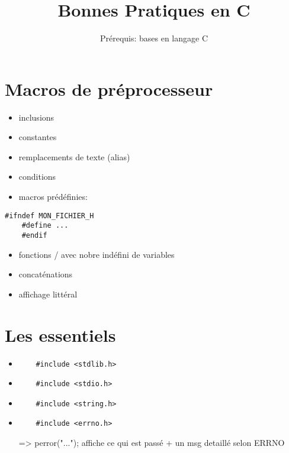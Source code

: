 \documentclass{article}
\title{Bonnes Pratiques en C}
\author{Prérequis: bases en langage C}
\date{}
\begin{document}
\maketitle
\section*{Macros de préprocesseur}
\begin{itemize}
\item inclusions
\item constantes
\item remplacements de texte (alias)
\item conditions
\item macros prédéfinies:
\end{itemize}

    \begin{lstlisting}[xleftmargin=\parindent]
    #ifndef MON_FICHIER_H
    #define ...
    #endif
    \end{lstlisting}

\begin{itemize}
    \item fonctions / avec nobre indéfini de variables
    \item concaténations
    \item affichage littéral
  \end{itemize}

\section*{Les essentiels}
\begin{itemize}
  \item \begin{verbatim}
    #include <stdlib.h>
  \end{verbatim}

  \item \begin{verbatim}
    #include <stdio.h>
  \end{verbatim}

  \item \begin{verbatim}
    #include <string.h>
  \end{verbatim}

  \item \begin{verbatim}
    #include <errno.h>
  \end{verbatim}
    => perror("..."); affiche ce qui est passé + un msg detaillé selon ERRNO
  \end{itemize}
\end{document}
